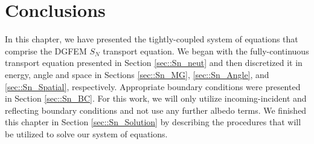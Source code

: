 \section{Conclusions}
\label{sec::Sn_Conclusions}

In this chapter, we have presented the tightly-coupled system of equations that comprise the DGFEM $S_N$ transport equation. We began with the fully-continuous transport equation presented in Section \ref{sec::Sn_neut} and then discretized it in energy, angle and space in Sections \ref{sec::Sn_MG}, \ref{sec::Sn_Angle}, and \ref{sec::Sn_Spatial}, respectively. Appropriate boundary conditions were presented in Section \ref{sec::Sn_BC}. For this work, we will only utilize incoming-incident and reflecting boundary conditions and not use any further albedo terms. We finished this chapter in Section \ref{sec::Sn_Solution} by describing the procedures that will be utilized to solve our system of equations.

